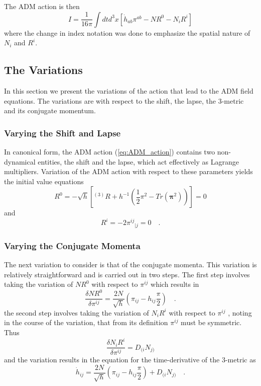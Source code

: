 \documentclass[twocolumn]{article}
\def\.{{\quad .}}
\begin{document}
The ADM action is then
\begin{equation}\label{eq:ADM_action}
   I = \frac{1}{16 \pi} \int dt d^3x \left[ {\dot h}_{ab} \pi^{ab}
                                            - N R^0 - N_i R^i \right]
\end{equation}
where the change in index notation was done to emphasize the spatial nature of
$N_i$ and $R^i$.


\subsection{The Variations}\label{SS:Variations}

In this section we present the variations of the action that lead to the
ADM field equations.  The variations are with respect to the shift, the lapse,
the 3-metric and its conjugate momentum.


\subsubsection{Varying the Shift and Lapse}

In canonical form, the ADM action (\ref{eq:ADM_action}) contains two non-
dynamical entities, the shift and the lapse, which act effectively as Lagrange
multipliers.  Variation of the ADM action with respect to these parameters
yields the initial value equations
\[
   R^0 = -\sqrt{h} \left[ {}^{(3)}R + h^{-1} \left( \frac{1}{2} {\pi}^2 -
                                                Tr \left( \mathbf{\pi}^2 \right)
                                             \right)
                   \right] = 0
\]
and
\[
   R^i = -2 {\pi^{ij}}_{|j} = 0 \.
\]


\subsubsection{Varying the Conjugate Momenta}

The next variation to consider is that of the conjugate momenta.  This variation
is relatively straightforward and is carried out in two steps.  The first step
involves taking the variation of $N R^0$ with respect to $\pi^{ij}$ which results
in
\[
\frac{ \delta N R^0}{\delta \pi^{ij}} = \frac{2 N}{\sqrt{h}}
                                      \left(
                                        \pi_{ij} - h_{ij} \frac{\pi}{2}
                                      \right) \.
\]
the second step involves taking the variation of $N_i R^i$ with respect to $\pi^{ij}$
, noting in the course of the variation, that from its definition $\pi^{ij}$ must
be symmetric.  Thus
\[
   \frac{\delta N_i R^i}{\delta \pi^{ij}} = D_{(i} N_{j)}
\]
and the variation results in the equation for the time-derivative of the 3-metric
as
\[
   {\dot h}_{ij} = \frac{2 N}{\sqrt{h}} \left( \pi_{ij} - h_{ij} \frac{\pi}{2}
                                        \right) + D_{(i} N_{j)} \.
\]
\end{document}
